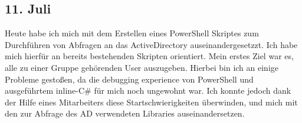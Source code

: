 \subsection{11. Juli}
Heute habe ich mich mit dem Erstellen eines PowerShell Skriptes zum Durchführen von Abfragen an das ActiveDirectory auseinandergesetzzt. Ich habe mich hierfür an bereits bestehenden Skripten orientiert. Mein erstes Ziel war es, alle zu einer Gruppe gehörenden User auszugeben. Hierbei bin ich an einige Probleme gestoßen, da die debugging experience von PowerShell und ausgeführtem inline-C\# für mich noch ungewohnt war. Ich konnte jedoch dank der Hilfe eines Mitarbeiters diese Startschwierigkeiten überwinden, und mich mit den zur Abfrage des AD verwendeten Libraries auseinandersetzen.